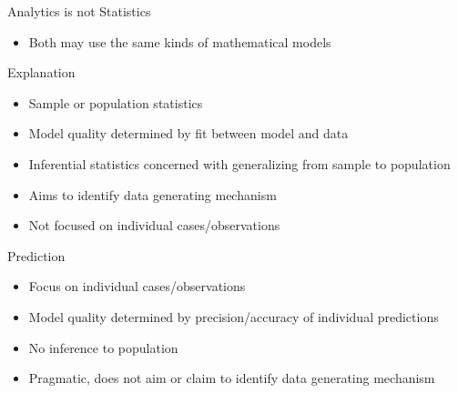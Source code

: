 \documentclass[ignorenonframetext,xcolor=dvipsnames]{beamer}
\begin{document}
\begin{frame}[label=full]{Analytics is not Statistics}
\footnotesize
\begin{itemize}
	\item Both may use the same kinds of mathematical models
\end{itemize}
\begin{block}{Explanation}
\begin{itemize}
	\item Sample or population statistics
	\item Model quality determined by fit between model and data
	\item Inferential statistics concerned with generalizing from sample to population
	\item Aims to identify data generating mechanism
	\item Not focused on individual cases/observations
\end{itemize}
\end{block}
\begin{block}{Prediction}
\begin{itemize}
	\item Focus on individual cases/observations
	\item Model quality determined by precision/accuracy of individual predictions
	\item No inference to population
	\item Pragmatic, does not aim or claim to identify data generating mechanism
\end{itemize}
\end{block}
\end{frame}
\end{document}
